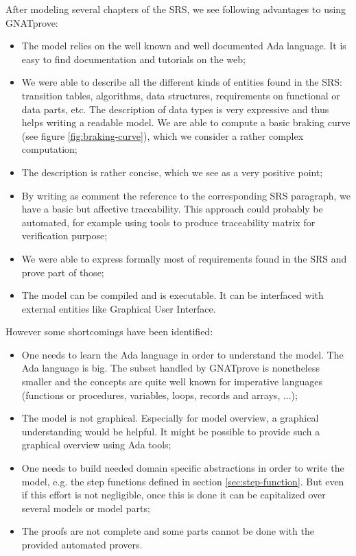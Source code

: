 \documentclass{template/openetcs_report}
\begin{document}
After modeling several chapters of the SRS, we see following
advantages to using GNATprove:

\begin{itemize}
\item The model relies on the well known and well documented Ada
  language. It is easy to find documentation and tutorials on the web;
\item We were able to describe all the different kinds of entities
  found in the SRS: transition tables, algorithms, data structures,
  requirements on functional or data parts, etc. The description of
  data types is very expressive and thus helps writing a readable
  model. We are able to compute a basic braking curve (see figure
  \ref{fig:braking-curve}), which we consider a rather complex
  computation;
\item The description is rather concise, which we see as a very
  positive point;
\item By writing as comment the reference to the corresponding SRS
  paragraph, we have a basic but affective traceability. This approach
  could probably be automated, for example using tools to produce
  traceability matrix for verification purpose;
\item We were able to express formally most of requirements found in
  the SRS and prove part of those;
\item The model can be compiled and is executable. It can be
  interfaced with external entities like Graphical User Interface.
\end{itemize}

However some shortcomings have been identified:
\begin{itemize}
\item One needs to learn the Ada language in order to understand the
  model. The Ada language is big. The subset handled by GNATprove is
  nonetheless smaller and the concepts are quite well known for
  imperative languages (functions or procedures, variables, loops,
  records and arrays, ...);
\item The model is not graphical. Especially for model overview, a
  graphical understanding would be helpful. It might be possible to
  provide such a graphical overview using Ada tools;
\item One needs to build needed domain specific abstractions in order
  to write the model, e.g. the step functions defined in section
  \ref{sec:step-function}. But even if this effort is not negligible,
  once this is done it can be capitalized over several models or model
  parts;
\item The proofs are not complete and some parts cannot be done with
  the provided automated provers.
\end{itemize}
\end{document}
